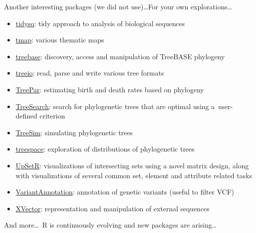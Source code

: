\documentclass[compress, ucs, xelatex, 11pt, xcolor=svgnames, aspectratio=169,
	hyperref={
		bookmarks=true,
		unicode=true,
		colorlinks=true,
		pdftitle={Molecular data in R},
		plainpages=false,
		pdfauthor={Vojtech Zeisek},
		pdfsubject={Course about phylogeny and evolution in R},
		pdfcreator={XeLaTeX},
		pdfkeywords={R, evolution, phylogeny, molecular data},
		linkcolor=Crimson, %
		anchorcolor=Magenta, %
		citecolor=Magenta, %
		filecolor=Magenta, %
		menucolor=Magenta, %
		urlcolor=DodgerBlue, %
		pdftex},
	url={hyphens, lowtilde} %
	]{beamer}
\begin{document}
\begin{frame}[allowframebreaks]{Another interesting packages (we did not use)\ldots}{For your own explorations\ldots}
\begin{itemize}
		\item \href{https://CRAN.R-project.org/package=tidysq}{tidysq}: tidy approach to analysis of biological sequences
		\item \href{https://CRAN.R-project.org/package=tmap}{tmap}: various thematic maps
		\item \href{https://CRAN.R-project.org/package=treebase}{treebase}: discovery, access and manipulation of TreeBASE phylogeny
		\item \href{https://bioconductor.org/packages/release/bioc/html/treeio.html}{treeio}: read, parse and write various tree formats
		\item \href{https://CRAN.R-project.org/package=TreePar}{TreePar}: estimating birth and death rates based on phylogeny
		\item \href{https://CRAN.R-project.org/package=TreeSearch}{TreeSearch}: search for phylogenetic trees that are optimal using a~user-defined criterion
		\item \href{https://CRAN.R-project.org/package=TreeSim}{TreeSim}: simulating phylogenetic trees
		\item \href{https://CRAN.R-project.org/package=treespace}{treespace}: exploration of distributions of phylogenetic trees
		\item \href{https://CRAN.R-project.org/package=UpSetR}{UpSetR}: visualizations of intersecting sets using a novel matrix design, along with visualizations of several common set, element and attribute related tasks
		\item \href{https://bioconductor.org/packages/VariantAnnotation/}{VariantAnnotation}: annotation of genetic variants (useful to filter VCF)
		\item \href{https://bioconductor.org/packages/release/bioc/html/XVector.html}{XVector}: representation and manipulation of external sequences
	\end{itemize}
	And more\ldots~R is continuously evolving and new packages are arising\ldots
\end{frame}
\end{document}
